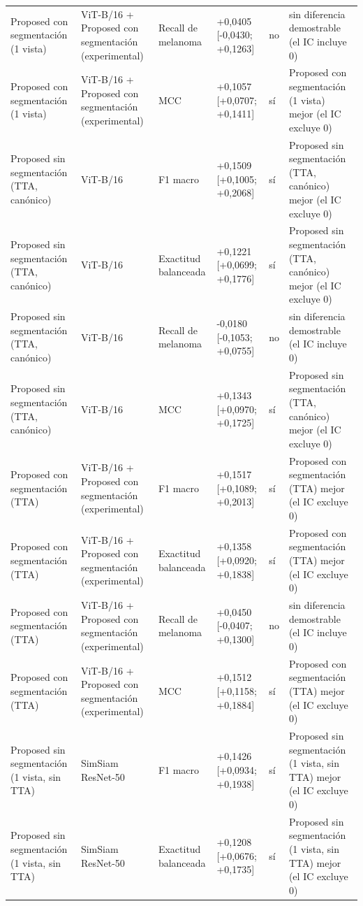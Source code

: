 \begin{longtable}{@{}llllll@{}}
Proposed con segmentación (1 vista) & ViT-B/16 + Proposed con segmentación (experimental) & Recall de melanoma & +0,0405 [-0,0430; +0,1263] & no & sin diferencia demostrable (el IC incluye 0) \\
Proposed con segmentación (1 vista) & ViT-B/16 + Proposed con segmentación (experimental) & MCC & +0,1057 [+0,0707; +0,1411] & sí & Proposed con segmentación (1 vista) mejor (el IC excluye 0) \\
Proposed sin segmentación (TTA, canónico) & ViT-B/16 & F1 macro & +0,1509 [+0,1005; +0,2068] & sí & Proposed sin segmentación (TTA, canónico) mejor (el IC excluye 0) \\
Proposed sin segmentación (TTA, canónico) & ViT-B/16 & Exactitud balanceada & +0,1221 [+0,0699; +0,1776] & sí & Proposed sin segmentación (TTA, canónico) mejor (el IC excluye 0) \\
Proposed sin segmentación (TTA, canónico) & ViT-B/16 & Recall de melanoma & -0,0180 [-0,1053; +0,0755] & no & sin diferencia demostrable (el IC incluye 0) \\
Proposed sin segmentación (TTA, canónico) & ViT-B/16 & MCC & +0,1343 [+0,0970; +0,1725] & sí & Proposed sin segmentación (TTA, canónico) mejor (el IC excluye 0) \\
Proposed con segmentación (TTA) & ViT-B/16 + Proposed con segmentación (experimental) & F1 macro & +0,1517 [+0,1089; +0,2013] & sí & Proposed con segmentación (TTA) mejor (el IC excluye 0) \\
Proposed con segmentación (TTA) & ViT-B/16 + Proposed con segmentación (experimental) & Exactitud balanceada & +0,1358 [+0,0920; +0,1838] & sí & Proposed con segmentación (TTA) mejor (el IC excluye 0) \\
Proposed con segmentación (TTA) & ViT-B/16 + Proposed con segmentación (experimental) & Recall de melanoma & +0,0450 [-0,0407; +0,1300] & no & sin diferencia demostrable (el IC incluye 0) \\
Proposed con segmentación (TTA) & ViT-B/16 + Proposed con segmentación (experimental) & MCC & +0,1512 [+0,1158; +0,1884] & sí & Proposed con segmentación (TTA) mejor (el IC excluye 0) \\
Proposed sin segmentación (1 vista, sin TTA) & SimSiam ResNet-50 & F1 macro & +0,1426 [+0,0934; +0,1938] & sí & Proposed sin segmentación (1 vista, sin TTA) mejor (el IC excluye 0) \\
Proposed sin segmentación (1 vista, sin TTA) & SimSiam ResNet-50 & Exactitud balanceada & +0,1208 [+0,0676; +0,1735] & sí & Proposed sin segmentación (1 vista, sin TTA) mejor (el IC excluye 0) \\

\end{longtable}
